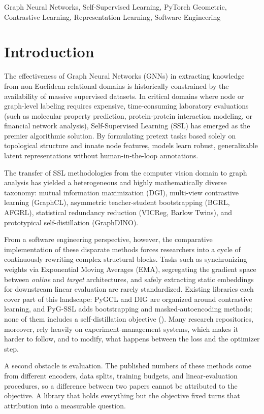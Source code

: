 \documentclass[conference]{IEEEtran}
\begin{document}
\begin{IEEEkeywords}
Graph Neural Networks, Self-Supervised Learning, PyTorch Geometric, Contrastive Learning, Representation Learning, Software Engineering
\end{IEEEkeywords}

\section{Introduction}
The effectiveness of Graph Neural Networks (GNNs) in extracting knowledge from non-Euclidean relational domains is historically constrained by the availability of massive supervised datasets. In critical domains where node or graph-level labeling requires expensive, time-consuming laboratory evaluations (such as molecular property prediction, protein-protein interaction modeling, or financial network analysis), Self-Supervised Learning (SSL) has emerged as the premier algorithmic solution. By formulating pretext tasks based solely on topological structure and innate node features, models learn robust, generalizable latent representations without human-in-the-loop annotations.

The transfer of SSL methodologies from the computer vision domain to graph analysis has yielded a heterogeneous and highly mathematically diverse taxonomy: mutual information maximization (DGI), multi-view contrastive learning (GraphCL), asymmetric teacher-student bootstrapping (BGRL, AFGRL), statistical redundancy reduction (VICReg, Barlow Twins), and prototypical self-distillation (GraphDINO).

From a software engineering perspective, however, the comparative implementation of these disparate methods forces researchers into a cycle of continuously rewriting complex structural blocks. Tasks such as synchronizing weights via Exponential Moving Averages (EMA), segregating the gradient space between \textit{online} and \textit{target} architectures, and safely extracting static embeddings for downstream linear evaluation are rarely standardized. Existing libraries each cover part of this landscape: PyGCL and DIG are organized around contrastive learning, and PyG-SSL adds bootstrapping and masked-autoencoding methods; none of them includes a self-distillation objective (). Many research repositories, moreover, rely heavily on experiment-management systems, which makes it harder to follow, and to modify, what happens between the loss and the optimizer step.

A second obstacle is evaluation. The published numbers of these methods come from different encoders, data splits, training budgets, and linear-evaluation procedures, so a difference between two papers cannot be attributed to the objective. A library that holds everything but the objective fixed turns that attribution into a measurable question.
\end{document}
